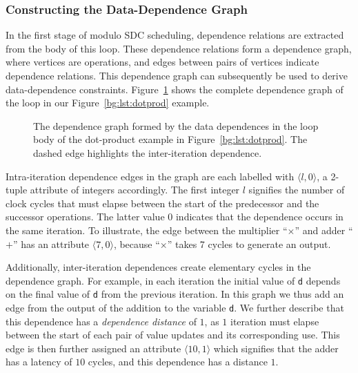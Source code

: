 \subsubsection{Constructing the Data-Dependence Graph}

In the first stage of modulo SDC scheduling, dependence relations are extracted
from the body of this loop.  These dependence relations form a dependence
graph, where vertices are operations, and edges between pairs of vertices
indicate dependence relations.  This dependence graph can subsequently be used
to derive data-dependence constraints.  Figure~\ref{bg:fig:depgraph} shows
the complete dependence graph of the loop in our Figure~\ref{bg:lst:dotprod}
example.
\begin{figure}[ht]
    \centering
    \caption{%
        The dependence graph formed by the data dependences in the loop body
        of the dot-product example in Figure~\ref{bg:lst:dotprod}.  The dashed
        edge highlights the inter-iteration dependence.
    }\label{bg:fig:depgraph}
\end{figure}

Intra-iteration dependence edges in the graph are each labelled with $\langle
l, 0 \rangle$, a 2-tuple attribute of integers accordingly.  The first integer
$l$ signifies the number of clock cycles that must elapse between the start of
the predecessor and the successor operations.  The latter value $0$ indicates
that the dependence occurs in the same iteration.  To illustrate, the edge
between the multiplier ``$\times$'' and adder ``$+$'' has an attribute $\langle
7, 0 \rangle$, because ``$\times$'' takes 7 cycles to generate an output.

Additionally, inter-iteration dependences create elementary cycles in the
dependence graph.  For example, in each iteration the initial value of \verb|d|
depends on the final value of \verb|d| from the previous iteration.  In this
graph we thus add an edge from the output of the addition to the variable
\verb|d|.  We further describe that this dependence has a \emph{dependence
distance} of $1$, as $1$ iteration must elapse between the start of each pair
of value updates and its corresponding use.  This edge is then further assigned
an attribute $\langle 10, 1 \rangle$ which signifies that the adder has a
latency of $10$ cycles, and this dependence has a distance $1$.


